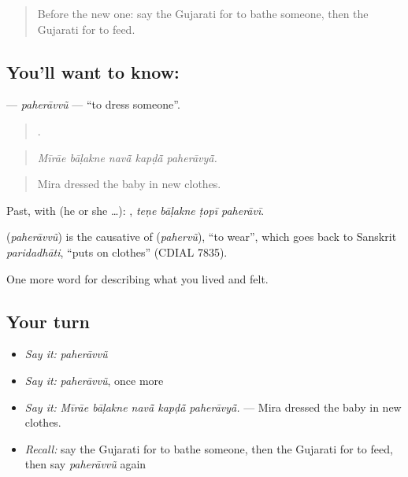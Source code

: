 \label{lesson:GU-C488-paheravvu}



\begin{quote}
Before the new one: say the Gujarati for to bathe someone, then the Gujarati for to feed.
\end{quote}

\subsection*{You'll want to know: }
\textbf{} — \emph{paherāvvũ} — \textquotedblleft{}to dress someone\textquotedblright{}.

\begin{quote}
    .
\end{quote}

\begin{quote}
\emph{Mīrāe bāḷakne navā̃ kapḍā̃ paherāvyā̃.}
\end{quote}

\begin{quote}
Mira dressed the baby in new clothes.
\end{quote}

Past, with  (he or she …):    , \emph{teṇe bāḷakne ṭopī paherāvī}.

\begin{cousinweb}
\textbf{} (\emph{paherāvvũ}) is the causative of \textbf{} (\emph{pahervũ}), \textquotedblleft{}to wear\textquotedblright{}, which goes back to Sanskrit \emph{paridadhāti}, \textquotedblleft{}puts on clothes\textquotedblright{} (CDIAL 7835).
\end{cousinweb}

\begin{grammarlens}[title={What you've built}]
One more word for describing what you lived and felt.
\end{grammarlens}

\subsection*{Your turn}
\begin{itemize}
\raggedright
  \item \emph{Say it:} \emph{paherāvvũ}
  \item \emph{Say it:} \emph{paherāvvũ}, once more
  \item \emph{Say it:} \emph{Mīrāe bāḷakne navā̃ kapḍā̃ paherāvyā̃.} — Mira dressed the baby in new clothes.
  \item \emph{Recall:} say the Gujarati for to bathe someone, then the Gujarati for to feed, then say \emph{paherāvvũ} again
\end{itemize}

